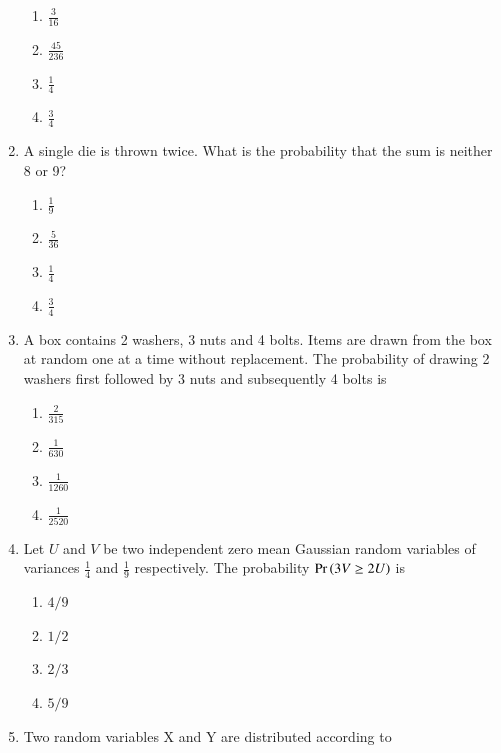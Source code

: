 \documentclass[journal,12pt,twocolumn]{IEEEtran}
\begin{document}
\begin{enumerate}
    \begin{enumerate}[label=\arabic*.]
        \item \Large$\frac{3}{16}$ \\
        \item $\frac{45}{236}$
        \item $\frac{1}{4}$ \\
        \item $\frac{3}{4}$
    \end{enumerate}
%
\solution

%
\item A single die is thrown twice. What is the probability that the sum is neither 8 or 9?
    \begin{enumerate}[label=(\alph*)]
        \item \large$\frac{1}{9}$
        \item \large$\frac{5}{36}$
        \item \large$\frac{1}{4}$
        \item \large$\frac{3}{4}$
    \end{enumerate}
%
\solution

%
\item A box contains 2 washers, 3 nuts and 4 bolts. Items are drawn from the box at random one at a time without replacement. The probability of drawing 2 washers first followed by 3 nuts and subsequently 4 bolts is
%
    \begin{enumerate}[label=(\Alph*)]
        \item \large$\frac{2}{315}$
        \item \large$\frac{1}{630}$
        \item \large$\frac{1}{1260}$
        \item \large$\frac{1}{2520}$
    \end{enumerate}
%
%
\solution

%
\item  Let $U$ and $V$ be two independent zero mean Gaussian random variables of variances $\frac{1}{4}$ and $\frac{1}{9}$ respectively. The probability $\Pr\left(3V\geq2U \right)$ is
\begin{enumerate}
    \item $4/9$
    \item $1/2$
    \item $2/3$
    \item $5/9$
\end{enumerate}
%
\solution

%
\item Two random variables X and Y are distributed according to

\end{enumerate}
\end{document}
